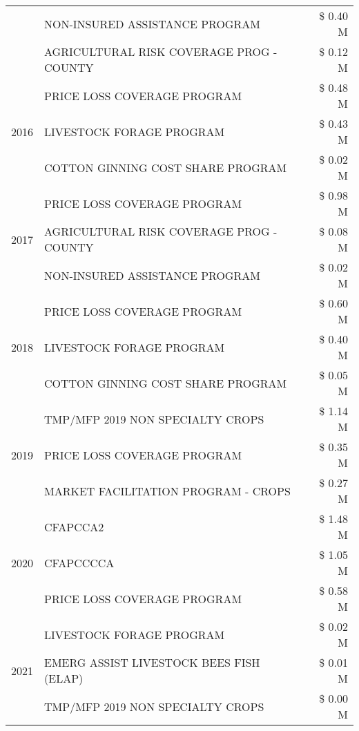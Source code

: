 \begin{tabular}{llr}
 & NON-INSURED ASSISTANCE PROGRAM & \$ 0.40 M \\
 & AGRICULTURAL RISK COVERAGE PROG - COUNTY & \$ 0.12 M \\
\cline{1-3}
\multirow[t]{3}{*}{2016} & PRICE LOSS COVERAGE PROGRAM & \$ 0.48 M \\
 & LIVESTOCK FORAGE PROGRAM & \$ 0.43 M \\
 & COTTON GINNING COST SHARE PROGRAM & \$ 0.02 M \\
\cline{1-3}
\multirow[t]{3}{*}{2017} & PRICE LOSS COVERAGE PROGRAM & \$ 0.98 M \\
 & AGRICULTURAL RISK COVERAGE PROG - COUNTY & \$ 0.08 M \\
 & NON-INSURED ASSISTANCE PROGRAM & \$ 0.02 M \\
\cline{1-3}
\multirow[t]{3}{*}{2018} & PRICE LOSS COVERAGE PROGRAM & \$ 0.60 M \\
 & LIVESTOCK FORAGE PROGRAM & \$ 0.40 M \\
 & COTTON GINNING COST SHARE PROGRAM & \$ 0.05 M \\
\cline{1-3}
\multirow[t]{3}{*}{2019} & TMP/MFP 2019 NON SPECIALTY CROPS & \$ 1.14 M \\
 & PRICE LOSS COVERAGE PROGRAM & \$ 0.35 M \\
 & MARKET FACILITATION PROGRAM - CROPS & \$ 0.27 M \\
\cline{1-3}
\multirow[t]{3}{*}{2020} & CFAPCCA2 & \$ 1.48 M \\
 & CFAPCCCCA & \$ 1.05 M \\
 & PRICE LOSS COVERAGE PROGRAM & \$ 0.58 M \\
\cline{1-3}
\multirow[t]{3}{*}{2021} & LIVESTOCK FORAGE PROGRAM & \$ 0.02 M \\
 & EMERG ASSIST LIVESTOCK BEES FISH (ELAP) & \$ 0.01 M \\
 & TMP/MFP 2019 NON SPECIALTY CROPS & \$ 0.00 M \\
\cline{1-3}
\bottomrule
\end{tabular}

